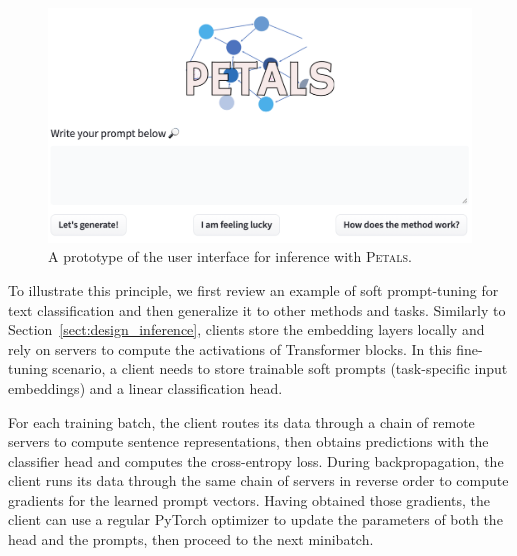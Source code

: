 \begin{figure}[tb]
    \centering
    \includegraphics[width=\linewidth]{resources/GUI.png}
    \caption{A prototype of the user interface for inference with \textsc{Petals}.}
    \label{fig:infernce_ui}
    \vspace{-5pt}
\end{figure}


To illustrate this principle, we first review an example of soft prompt-tuning for text classification and then generalize it to other methods and tasks.
Similarly to Section~\ref{sect:design_inference}, clients store the embedding layers locally and rely on servers to compute the activations of Transformer blocks. In this fine-tuning scenario, a client needs to store trainable soft prompts (task-specific input embeddings) and a linear classification head. 

For each training batch, the client routes its data through a chain of remote servers to compute sentence representations, then obtains predictions with the classifier head and computes the cross-entropy loss.
During backpropagation, the client runs its data through the same chain of servers in reverse order to compute gradients for the learned prompt vectors. Having obtained those gradients, the client can use a regular PyTorch optimizer to update the parameters of both the head and the prompts, then proceed to the next minibatch.

